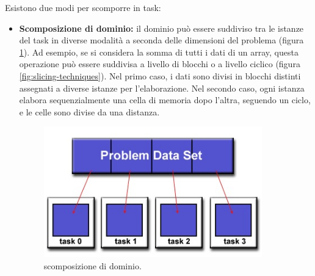 Esistono due modi per scomporre in task:
\begin{itemize}
    \item \textbf{Scomposizione di dominio:} il dominio può essere suddiviso tra le istanze del task in diverse modalità a seconda delle dimensioni del problema (figura \ref{fig:domain-decomposition}). Ad esempio, se si considera la somma di tutti i dati di un array, questa operazione può essere suddivisa a livello di blocchi o a livello ciclico (figura \ref{fig:slicing-techniques}). Nel primo caso, i dati sono divisi in blocchi distinti assegnati a diverse istanze per l'elaborazione. Nel secondo caso, ogni istanza elabora sequenzialmente una cella di memoria dopo l'altra, seguendo un ciclo, e le celle sono divise da una distanza. 
        \begin{figure}[th]
    	\centering
    	\includegraphics[width=0.7\linewidth]{img/domain-decomposition.png}
    	\caption{scomposizione di dominio.}
    	\label{fig:domain-decomposition}
    \end{figure}
    

\end{itemize}
